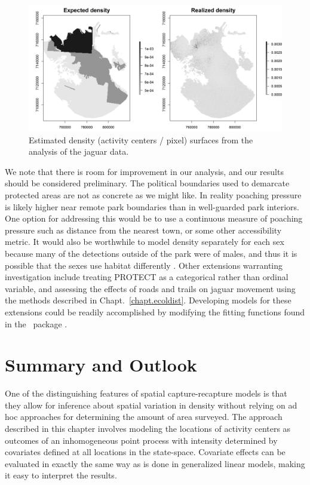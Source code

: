 \begin{figure}%
\centering
\includegraphics[width=\textwidth]{Ch11-Statespace/figs/reD}
\caption{Estimated density (activity centers / pixel) surfaces from
  the analysis of the jaguar data.}
\label{state-space.fig.Dsurface}
\end{figure}

We note that there is room for improvement in our analysis, and our
results should be considered preliminary. The
political boundaries used to demarcate protected areas are not as
concrete as we might like. In reality poaching pressure is likely
higher near remote park boundaries than in well-guarded park
interiors. One option for addressing this would be to use a continuous
measure of poaching pressure such as distance from the nearest town,
or some other accessibility metric. It would also be worthwhile to
model density separately for each sex because many of the detections outside
of the park were of males, and thus it is possible that the sexes use
habitat differently \citep{conde_etal:2010}. Other extensions warranting
investigation include treating PROTECT as a categorical rather than
ordinal variable, and assessing the effects of
roads and trails on jaguar movement using the methods described in
Chapt.~\ref{chapt.ecoldist}. %
Developing models for these extensions
could be readily accomplished by modifying the fitting functions found
in the \R~package \scrbook.



\section{Summary and Outlook}

One of the distinguishing features of spatial capture-recapture models
is that they allow for inference about spatial variation
in density without relying on ad hoc approaches for determining the
amount of area surveyed. The approach described
in this chapter involves modeling the locations of activity centers as outcomes
of an inhomogeneous point process with intensity determined by
covariates defined at all locations in the state-space. Covariate
effects can be evaluated in exactly the same way as is done in
generalized linear models, making it easy to interpret the results.

